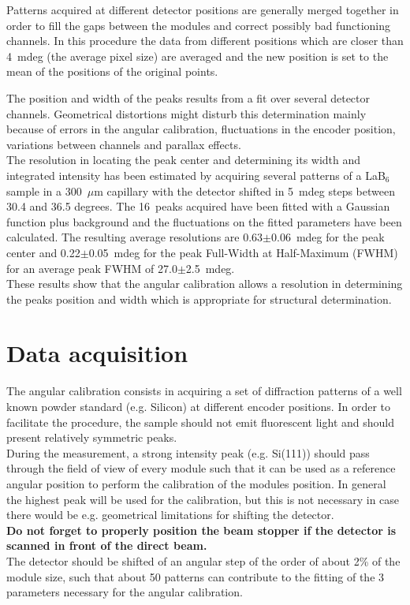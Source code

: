 Patterns acquired at different detector positions are generally merged together  in order to fill the gaps between the modules and correct possibly bad functioning channels. In this procedure the data from different positions which are closer than 4~mdeg (the average pixel size) are averaged and the new position is set to the mean of the positions of the original points.


The position and width of the peaks results from a fit over several detector channels. Geometrical distortions might disturb this determination mainly because of errors in the angular calibration, fluctuations in the encoder position, variations between channels and parallax effects.\\
The resolution in locating the peak center and determining its width and integrated intensity has been estimated by acquiring several patterns of a LaB$_6$ sample in a 300~$\mu$m capillary with the detector shifted in 5~mdeg steps between 30.4 and 36.5 degrees. The 16~peaks acquired have been fitted with a Gaussian function plus background and the fluctuations on the fitted parameters have been calculated. The resulting average resolutions are  0.63$\pm$0.06~mdeg for the peak center and 0.22$\pm$0.05~mdeg for the peak Full-Width at Half-Maximum (FWHM) for an average peak FWHM of 27.0$\pm$2.5~mdeg. \\
These results show that  the angular calibration allows a resolution in determining the peaks position and width which is appropriate for structural determination.

\section{Data acquisition}

The angular calibration consists in acquiring a set of diffraction patterns of a well known powder standard (e.g. Silicon) at different encoder positions.  In order to facilitate the procedure, the sample should not emit fluorescent light and should present relatively symmetric peaks. \\
During the measurement, a strong intensity peak (e.g. Si(111)) should pass through the field of view of every module such that it can be used as a reference angular position to perform the calibration of the modules position. In general the highest peak will be used for the calibration, but this is not necessary in case there would be e.g. geometrical limitations for shifting the detector. \\ \textbf{Do not forget to properly position the beam stopper if the detector is scanned in front of the direct beam.}\\
The detector should be shifted of an angular step of the order of about 2\% of the module size, such that about 50 patterns can contribute to the fitting of the 3 parameters necessary for the angular calibration.\\
 

